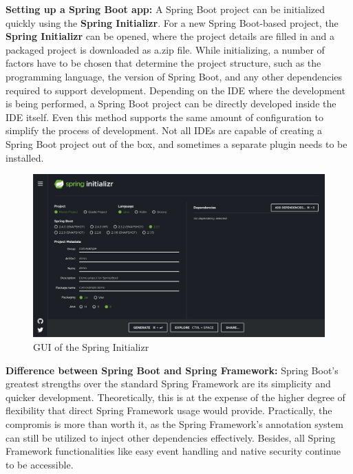     \textbf{Setting up a Spring Boot app:} \newline
    A Spring Boot project can be initialized quickly using the \textbf{Spring Initializr}. For a new Spring Boot-based project, the \textbf{Spring Initializr} can be opened, where the project details are filled in and a packaged project is downloaded as a.zip file. While initializing, a number of factors have to be chosen that determine the project structure, such as the programming language, the version of Spring Boot, and any other dependencies required to support development. \newline
    Depending on the IDE where the development is being performed, a Spring Boot project can be directly developed inside the IDE itself. Even this method supports the same amount of configuration to simplify the process of development. Not all IDEs are capable of creating a Spring Boot project out of the box, and sometimes a separate plugin needs to be installed.

    \begin{figure} [H]
        \centering
        \includegraphics [width=1\textwidth] {images/andreas/springFramework/springInit.jpg}
        \caption{GUI of the Spring Initializr}
    \end{figure}
    
    \textbf{Difference between Spring Boot and Spring Framework:} \newline
    Spring Boot's greatest strengths over the standard Spring Framework are its simplicity and quicker development. Theoretically, this is at the expense of the higher degree of flexibility that direct Spring Framework usage would provide. Practically, the compromis is more than  worth it, as the Spring Framework's annotation system can still be utilized to inject other dependencies effectively. Besides, all Spring Framework functionalities like easy event handling and native security continue to be accessible.
    
